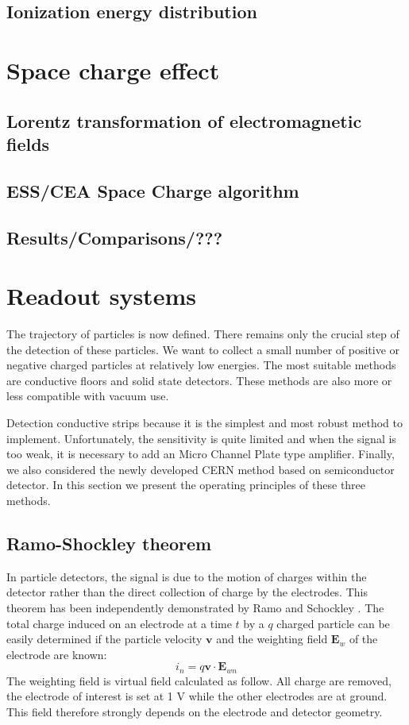 \begin{refsection}
  \subsection{Ionization energy distribution}
  
  
	\section{Space charge effect}
	\subsection{Lorentz transformation of electromagnetic fields}
	\subsection{ESS/CEA Space Charge algorithm}
	\subsection{Results/Comparisons/???}
	\section{Readout systems}
	The trajectory of particles is now defined. There remains only the crucial step of the detection of these particles. We want to collect a small number of positive or negative charged particles at relatively low energies. The most suitable methods are conductive floors and solid state detectors. These methods are also more or less compatible with vacuum use.

	Detection conductive strips because it is the simplest and most robust method to implement. Unfortunately, the sensitivity is quite limited and when the signal is too weak, it is necessary to add an Micro Channel Plate type amplifier. Finally, we also considered the newly developed CERN method based on semiconductor detector. In this section we present the operating principles of these three methods.

	\subsection{Ramo-Shockley theorem}
	\label{chap3:ramo}
	In particle detectors, the signal is due to the motion of charges within the detector rather than the direct collection of charge by the electrodes. This theorem has been independently demonstrated by Ramo and Schockley \cite{Ramo_1939,Shockley_1938}. The total charge induced on an electrode at a time $t$ by a $q$ charged particle can be easily determined if the particle velocity $\boldsymbol{v}$ and the weighting field $\boldsymbol{E}_{w}$ of the electrode are known:
	\begin{equation}
		i_{n}= q\boldsymbol{v} \cdot \boldsymbol{E}_{wn}
	\end{equation}
	The weighting field is virtual field calculated as follow. All charge are removed, the electrode of interest is set at 1 V while the other electrodes are at ground. This field therefore strongly depends on the electrode and detector geometry.


\end{refsection}
